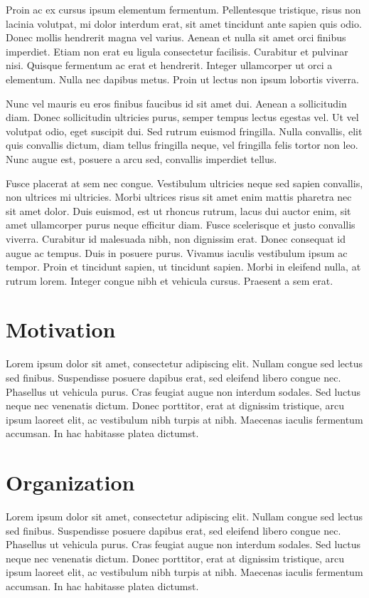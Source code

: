 \documentclass{utitcphd_overleaf}
\begin{document}
Proin ac ex cursus ipsum elementum fermentum. Pellentesque tristique, risus non lacinia volutpat, mi dolor interdum erat, sit amet tincidunt ante sapien quis odio. Donec mollis hendrerit magna vel varius. Aenean et nulla sit amet orci finibus imperdiet. Etiam non erat eu ligula consectetur facilisis. Curabitur et pulvinar nisi. Quisque fermentum ac erat et hendrerit. Integer ullamcorper ut orci a elementum. Nulla nec dapibus metus. Proin ut lectus non ipsum lobortis viverra.

Nunc vel mauris eu eros finibus faucibus id sit amet dui. Aenean a sollicitudin diam. Donec sollicitudin ultricies purus, semper tempus lectus egestas vel. Ut vel volutpat odio, eget suscipit dui. Sed rutrum euismod fringilla. Nulla convallis, elit quis convallis dictum, diam tellus fringilla neque, vel fringilla felis tortor non leo. Nunc augue est, posuere a arcu sed, convallis imperdiet tellus.

Fusce placerat at sem nec congue. Vestibulum ultricies neque sed sapien convallis, non ultrices mi ultricies. Morbi ultrices risus sit amet enim mattis pharetra nec sit amet dolor. Duis euismod, est ut rhoncus rutrum, lacus dui auctor enim, sit amet ullamcorper purus neque efficitur diam. Fusce scelerisque et justo convallis viverra. Curabitur id malesuada nibh, non dignissim erat. Donec consequat id augue ac tempus. Duis in posuere purus. Vivamus iaculis vestibulum ipsum ac tempor. Proin et tincidunt sapien, ut tincidunt sapien. Morbi in eleifend nulla, at rutrum lorem. Integer congue nibh et vehicula cursus. Praesent a sem erat.

\section{Motivation}

Lorem ipsum dolor sit amet, consectetur adipiscing elit. Nullam congue sed lectus sed finibus. Suspendisse posuere dapibus erat, sed eleifend libero congue nec. Phasellus ut vehicula purus. Cras feugiat augue non interdum sodales. Sed luctus neque nec venenatis dictum. Donec porttitor, erat at dignissim tristique, arcu ipsum laoreet elit, ac vestibulum nibh turpis at nibh. Maecenas iaculis fermentum accumsan. In hac habitasse platea dictumst.

\section{Organization}

Lorem ipsum dolor sit amet, consectetur adipiscing elit. Nullam congue sed lectus sed finibus. Suspendisse posuere dapibus erat, sed eleifend libero congue nec. Phasellus ut vehicula purus. Cras feugiat augue non interdum sodales. Sed luctus neque nec venenatis dictum. Donec porttitor, erat at dignissim tristique, arcu ipsum laoreet elit, ac vestibulum nibh turpis at nibh. Maecenas iaculis fermentum accumsan. In hac habitasse platea dictumst.
\end{document}
